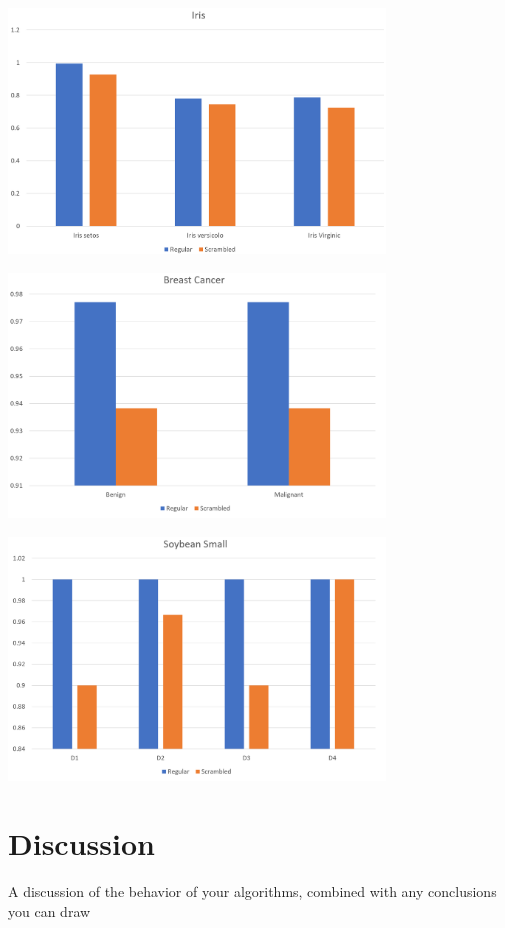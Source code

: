\documentclass[twoside,11pt]{article}
\begin{document}
\begin{center}
\includegraphics[width=10cm]{iris.png}
\end{center}
\begin{center}
\includegraphics[width=10cm]{breastCan.png}


\includegraphics[width=10cm]{soybean.png}
\end{center}




\section{Discussion}

A discussion of the behavior of your algorithms, combined with any conclusions you can draw
\end{document}
